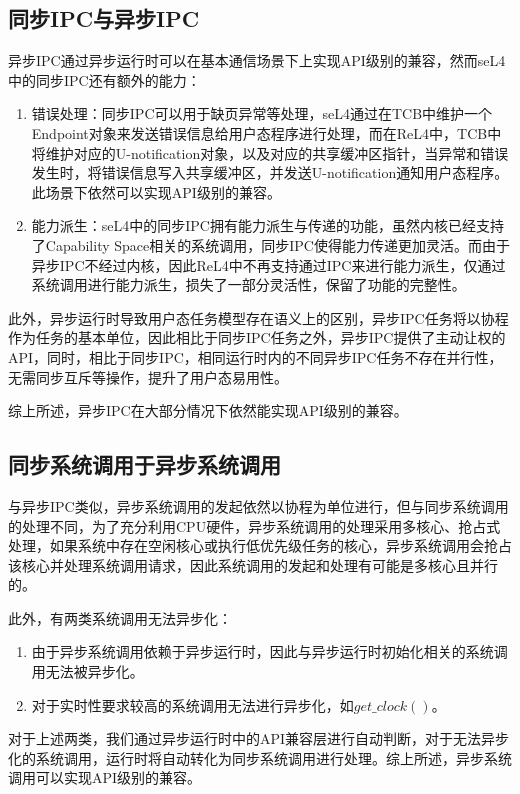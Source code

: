 \subsection{同步IPC与异步IPC}

异步IPC通过异步运行时可以在基本通信场景下上实现API级别的兼容，然而seL4中的同步IPC还有额外的能力：
\begin{enumerate}
  \item 	错误处理：同步IPC可以用于缺页异常等处理，seL4通过在TCB中维护一个Endpoint对象来发送错误信息给用户态程序进行处理，而在ReL4中，TCB中将维护对应的U-notification对象，以及对应的共享缓冲区指针，当异常和错误发生时，将错误信息写入共享缓冲区，并发送U-notification通知用户态程序。此场景下依然可以实现API级别的兼容。
  \item 能力派生：seL4中的同步IPC拥有能力派生与传递的功能，虽然内核已经支持了Capability Space相关的系统调用，同步IPC使得能力传递更加灵活。而由于异步IPC不经过内核，因此ReL4中不再支持通过IPC来进行能力派生，仅通过系统调用进行能力派生，损失了一部分灵活性，保留了功能的完整性。
\end{enumerate}

此外，异步运行时导致用户态任务模型存在语义上的区别，异步IPC任务将以协程作为任务的基本单位，因此相比于同步IPC任务之外，异步IPC提供了主动让权的API，同时，相比于同步IPC，相同运行时内的不同异步IPC任务不存在并行性，无需同步互斥等操作，提升了用户态易用性。

综上所述，异步IPC在大部分情况下依然能实现API级别的兼容。

\subsection{同步系统调用于异步系统调用}
与异步IPC类似，异步系统调用的发起依然以协程为单位进行，但与同步系统调用的处理不同，为了充分利用CPU硬件，异步系统调用的处理采用多核心、抢占式处理，如果系统中存在空闲核心或执行低优先级任务的核心，异步系统调用会抢占该核心并处理系统调用请求，因此系统调用的发起和处理有可能是多核心且并行的。

此外，有两类系统调用无法异步化：
\begin{enumerate}
  \item 由于异步系统调用依赖于异步运行时，因此与异步运行时初始化相关的系统调用无法被异步化。
  \item 对于实时性要求较高的系统调用无法进行异步化，如$get\_clock()$。
\end{enumerate}

对于上述两类，我们通过异步运行时中的API兼容层进行自动判断，对于无法异步化的系统调用，运行时将自动转化为同步系统调用进行处理。综上所述，异步系统调用可以实现API级别的兼容。

